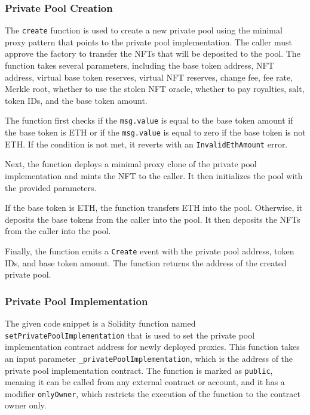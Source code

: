 \hypertarget{private-pool-creation}{%
\subsubsection{Private Pool Creation}\label{private-pool-creation}}

The \texttt{create} function is used to create a new private pool using
the minimal proxy pattern that points to the private pool
implementation. The caller must approve the factory to transfer the NFTs
that will be deposited to the pool. The function takes several
parameters, including the base token address, NFT address, virtual base
token reserves, virtual NFT reserves, change fee, fee rate, Merkle root,
whether to use the stolen NFT oracle, whether to pay royalties, salt,
token IDs, and the base token amount.

The function first checks if the \texttt{msg.value} is equal to the base
token amount if the base token is ETH or if the \texttt{msg.value} is
equal to zero if the base token is not ETH. If the condition is not met,
it reverts with an \texttt{InvalidEthAmount} error.

Next, the function deploys a minimal proxy clone of the private pool
implementation and mints the NFT to the caller. It then initializes the
pool with the provided parameters.

If the base token is ETH, the function transfers ETH into the pool.
Otherwise, it deposits the base tokens from the caller into the pool. It
then deposits the NFTs from the caller into the pool.

Finally, the function emits a \texttt{Create} event with the private
pool address, token IDs, and base token amount. The function returns the
address of the created private pool.

\hypertarget{private-pool-implementation}{%
\subsubsection{Private Pool
Implementation}\label{private-pool-implementation}}

The given code snippet is a Solidity function named
\texttt{setPrivatePoolImplementation} that is used to set the private
pool implementation contract address for newly deployed proxies. This
function takes an input parameter \texttt{\_privatePoolImplementation},
which is the address of the private pool implementation contract. The
function is marked as \texttt{public}, meaning it can be called from any
external contract or account, and it has a modifier \texttt{onlyOwner},
which restricts the execution of the function to the contract owner
only.

